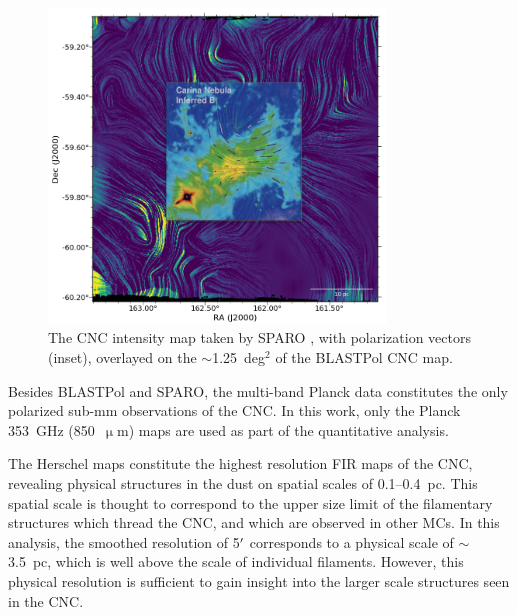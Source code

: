 \begin{figure}[!htbp]
\centering
\includegraphics[width=0.8\textwidth]{figures/carina/lic_sparo_overlay}
\caption[~The CNC intensity map taken by SPARO overlayed on the  of the BLASTPol CNC map.]{The CNC intensity map taken by SPARO \citep{li2006results}, with polarization vectors (inset), overlayed on the $\sim$1.25~deg$^{2}$ of the BLASTPol CNC map.}
\label{fig:lic_sparo_overlay}
\end{figure}

Besides BLASTPol and SPARO, the multi-band Planck data constitutes the only polarized sub-mm observations of the CNC. In this work, only the Planck 353~GHz (850~$\upmu$m) maps are used as part of the quantitative analysis.

The Herschel maps constitute the highest resolution FIR maps of the CNC, revealing physical structures in the dust on spatial scales of 0.1--0.4~pc. This spatial scale is thought to correspond to the upper size limit of the filamentary structures which thread the CNC, and which are observed in other MCs. In this analysis, the smoothed resolution of 5$\operatorname{^{\prime}}$ corresponds to a physical scale of $\sim$3.5~pc, which is well above the scale of individual filaments. However, this physical resolution is sufficient to gain insight into the larger scale structures seen in the CNC.

